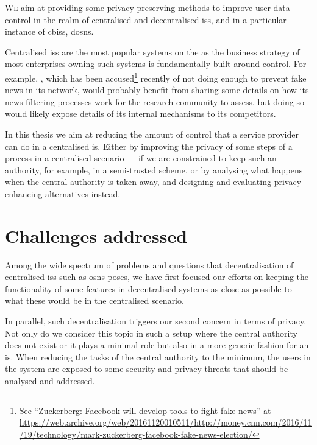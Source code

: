 

\lettrine{\textcolor[gray]{.25}{W}}{e} aim at providing some privacy-preserving 
methods to improve user data control in the realm of centralised and decentralised 
\acp{is}, and in a particular instance of \acp{cbis}, \acp{dosn}.

Centralised \acp{is} are the most popular systems on the \Internet as the business 
strategy of most enterprises owning such systems is fundamentally built around control. 
For example, \Facebook, which has been accused\footnote{See ``Zuckerberg: Facebook will develop tools to fight fake news'' at \url{https://web.archive.org/web/20161120010511/http://money.cnn.com/2016/11/19/technology/mark-zuckerberg-facebook-fake-news-election/}} 
recently of not doing enough to prevent fake news in its network, would probably 
benefit from sharing some details on how its news filtering processes work for the 
research community to assess, but doing so would likely expose details of its internal 
mechanisms to its competitors.

In this thesis we aim at reducing the amount of control that a service provider 
can do in a centralised \ac{is}. Either by improving the privacy of some steps of 
a process in a centralised scenario --- if we are constrained to keep such an authority, 
for example, in a semi-trusted scheme, or by analysing what happens when the central 
authority is taken away, and designing and evaluating privacy-enhancing alternatives 
instead.

\section{Challenges addressed}
    \label{section:thesis:challenges-addressed}
Among the wide spectrum of problems and questions that decentralisation of centralised 
\acp{is} such as \acp{osn} poses, we have first focused our efforts on keeping the 
functionality of some features in decentralised systems as close as possible to 
what these would be in the centralised scenario.

In parallel, such decentralisation triggers our second concern in terms of privacy.
Not only do we consider this topic in such a setup where the central authority does 
not exist or it plays a minimal role but also in a more generic fashion for an \ac{is}. 
When reducing the tasks of the central authority to the minimum, the users in the 
system are exposed to some security and privacy threats that should be analysed 
and addressed.


